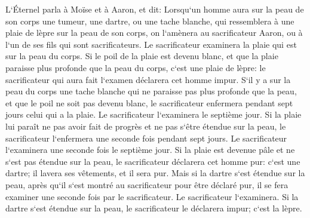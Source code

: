 \verse L`Éternel parla à Moïse et à Aaron, et dit: 
\verse Lorsqu`un homme aura sur la peau de son corps une tumeur, une dartre, ou une tache blanche, qui ressemblera à une plaie de lèpre sur la peau de son corps, on l`amènera au sacrificateur Aaron, ou à l`un de ses fils qui sont sacrificateurs. 
\verse Le sacrificateur examinera la plaie qui est sur la peau du corps. Si le poil de la plaie est devenu blanc, et que la plaie paraisse plus profonde que la peau du corps, c`est une plaie de lèpre: le sacrificateur qui aura fait l`examen déclarera cet homme impur. 
\verse S`il y a sur la peau du corps une tache blanche qui ne paraisse pas plus profonde que la peau, et que le poil ne soit pas devenu blanc, le sacrificateur enfermera pendant sept jours celui qui a la plaie. 
\verse Le sacrificateur l`examinera le septième jour. Si la plaie lui paraît ne pas avoir fait de progrès et ne pas s`être étendue sur la peau, le sacrificateur l`enfermera une seconde fois pendant sept jours. 
\verse Le sacrificateur l`examinera une seconde fois le septième jour. Si la plaie est devenue pâle et ne s`est pas étendue sur la peau, le sacrificateur déclarera cet homme pur: c`est une dartre; il lavera ses vêtements, et il sera pur. 
\verse Mais si la dartre s`est étendue sur la peau, après qu`il s`est montré au sacrificateur pour être déclaré pur, il se fera examiner une seconde fois par le sacrificateur. 
\verse Le sacrificateur l`examinera. Si la dartre s`est étendue sur la peau, le sacrificateur le déclarera impur; c`est la lèpre. 
